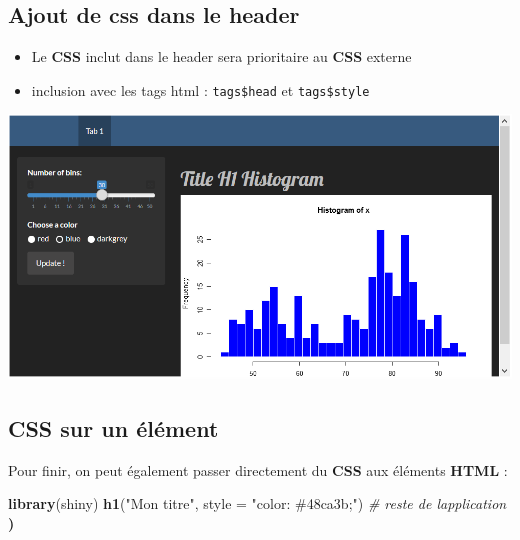 \documentclass[
]{article}
\newenvironment{Shaded}{\begin{snugshade}}{\end{snugshade}}
\newcommand{\AttributeTok}[1]{\textcolor[rgb]{0.13,0.29,0.53}{#1}}
\newcommand{\CommentTok}[1]{\textcolor[rgb]{0.56,0.35,0.01}{\textit{#1}}}
\newcommand{\ErrorTok}[1]{\textcolor[rgb]{0.64,0.00,0.00}{\textbf{#1}}}
\newcommand{\FunctionTok}[1]{\textcolor[rgb]{0.13,0.29,0.53}{\textbf{#1}}}
\newcommand{\NormalTok}[1]{#1}
\newcommand{\SpecialCharTok}[1]{\textcolor[rgb]{0.81,0.36,0.00}{\textbf{#1}}}
\newcommand{\StringTok}[1]{\textcolor[rgb]{0.31,0.60,0.02}{#1}}
\providecommand{\tightlist}{%
  \setlength{\itemsep}{0pt}\setlength{\parskip}{0pt}}
\begin{document}
\hypertarget{ajout-de-css-dans-le-header}{%
\subsection{Ajout de css dans le
header}\label{ajout-de-css-dans-le-header}}

\begin{itemize}
\tightlist
\item
  Le \textbf{CSS} inclut dans le header sera prioritaire au \textbf{CSS}
  externe
\item
  inclusion avec les tags html : \texttt{tags\$head} et
  \texttt{tags\$style}
\end{itemize}

\begin{Shaded}
\end{Shaded}

\includegraphics{img/css2.png}

\hypertarget{css-sur-un-uxe9luxe9ment}{%
\subsection{CSS sur un élément}\label{css-sur-un-uxe9luxe9ment}}

Pour finir, on peut également passer directement du \textbf{CSS} aux
éléments \textbf{HTML} :

\begin{Shaded}
\begin{Highlighting}[]
\FunctionTok{library}\NormalTok{(shiny)}
\FunctionTok{h1}\NormalTok{(}\StringTok{"Mon titre"}\NormalTok{, }\AttributeTok{style =} \StringTok{"color: \#48ca3b;"}\NormalTok{)}
\CommentTok{\# reste de l\textquotesingle{}application}
\ErrorTok{)}
\end{Highlighting}
\end{Shaded}
\end{document}
